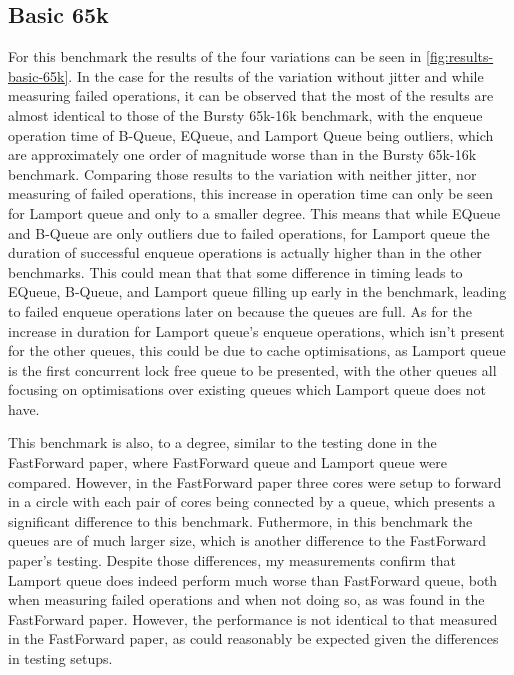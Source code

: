 \subsection{Basic 65k}

For this benchmark the results of the four variations can be seen in \autoref{fig:results-basic-65k}.
In the case for the results of the variation without jitter and while measuring failed operations,
it can be observed that the most of the results are almost identical to those of the Bursty 65k-16k benchmark,
with the enqueue operation time of B-Queue, EQueue, and Lamport Queue being outliers,
which are approximately one order of magnitude worse than in the Bursty 65k-16k benchmark.
Comparing those results to the variation with neither jitter, nor measuring of failed operations,
this increase in operation time can only be seen for Lamport queue and only to a smaller degree.
This means that while EQueue and B-Queue are only outliers due to failed operations,
for Lamport queue the duration of successful enqueue operations is actually higher than in the other benchmarks.
This could mean that that some difference in timing leads to EQueue, B-Queue, and Lamport queue filling up
early in the benchmark, leading to failed enqueue operations later on because the queues are full.
As for the increase in duration for Lamport queue's enqueue operations, which isn't present for the other queues,
this could be due to cache optimisations, as Lamport queue is the first concurrent lock free queue to be presented,
with the other queues all focusing on optimisations over existing queues which Lamport queue does not
have\cite{Lamport}.

This benchmark is also, to a degree, similar to the testing done in the FastForward paper, where FastForward
queue and Lamport queue were compared.
However, in the FastForward paper three cores were setup to forward in a circle with each pair of cores being
connected by a queue, which presents a significant difference to this benchmark\cite{FastForward}.
Futhermore, in this benchmark the queues are of much larger size, which is another difference to the
FastForward paper's testing.
Despite those differences, my measurements confirm that Lamport queue does indeed perform much worse than
FastForward queue, both when measuring failed operations and when not doing so, as was found in the FastForward paper.
However, the performance is not identical to that measured in the FastForward paper, as could reasonably be
expected given the differences in testing setups.

